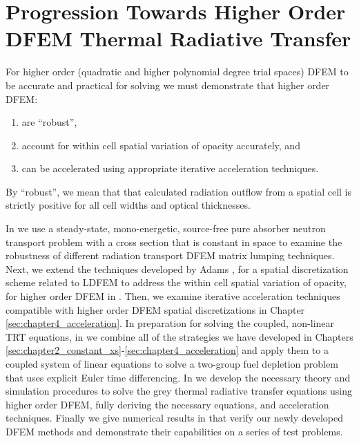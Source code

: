 \section{Progression Towards Higher Order DFEM Thermal Radiative Transfer}

For higher order (quadratic and higher polynomial degree trial spaces) DFEM to be accurate and practical for solving  we must demonstrate that higher order DFEM:
\begin{enumerate}
\item are ``robust'',
\item account for within cell spatial variation of opacity accurately, and
\item can be accelerated using appropriate iterative acceleration techniques.
\end{enumerate}
By ``robust'', we mean that that calculated radiation outflow from a spatial cell is strictly positive for all cell widths and optical thicknesses.

In  we use a steady-state, mono-energetic, source-free pure absorber neutron transport problem with a cross section that is constant in space to examine the robustness of different radiation transport DFEM matrix lumping techniques.
Next, we extend the techniques developed by Adams \cite{adams_scb,adams_nowak}, for a spatial discretization scheme related to LDFEM  to address the within cell spatial variation of opacity, for higher order DFEM in  .
Then, we examine iterative acceleration techniques compatible with higher order DFEM spatial discretizations in Chapter \ref{sec:chapter4_acceleration}.
In preparation for solving the coupled, non-linear TRT equations, in  we combine all of the strategies we have developed in Chapters \ref{sec:chapter2_constant_xs}-\ref{sec:chapter4_acceleration} and apply them to a coupled system of linear equations to solve a two-group fuel depletion problem that uses explicit Euler time differencing.
In  we develop the necessary theory and simulation procedures to solve the grey thermal radiative transfer equations using higher order DFEM, fully deriving the necessary  equations, and acceleration techniques. 
Finally we give numerical results in  that verify our newly developed DFEM methods and demonstrate their capabilities on a series of test problems. 

